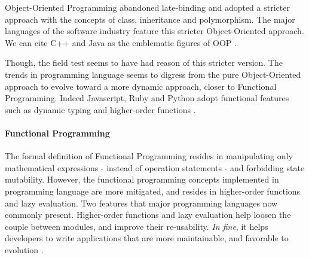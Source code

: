 Object-Oriented Programming abandoned late-binding and adopted a stricter approach with the concepts of class, inheritance and polymorphism.
The major languages of the software industry feature this stricter Object-Oriented approach.
We can cite C++ and Java as the emblematic figures of OOP \cite{Gosling2000,Stroustrup1986}.

Though, the field test seems to have had reason of this stricter version.
The trends in programming language seems to digress from the pure Object-Oriented approach to evolve toward a more dynamic approach, closer to Functional Programming.
Indeed Javascript, Ruby and Python adopt functional features such as dynamic typing and higher-order functions \cite{Ecma1999}.








\paragraph{Functional Programming} \label{chapter3:software-design:programming-models:functional-programming}


The formal definition of Functional Programming resides in manipulating only mathematical expressions - instead of operation statements - and forbidding state mutability.
However, the functional programming concepts implemented in programming language are more mitigated, and resides in higher-order functions and lazy evaluation.
Two features that major programming languages now commonly present.
Higher-order functions and lazy evaluation help loosen the couple between modules, and improve their re-usability.
\textit{In fine}, it helps developers to write applications that are more maintainable, and favorable to evolution \cite{Hughes1989}.

